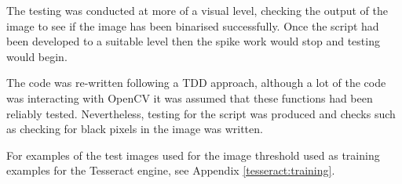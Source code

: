 The testing was conducted at more of a visual level, checking the output of the image to see if the image has been binarised successfully. Once the script had been developed to a suitable level then the spike work would stop and testing would begin.

The code was re-written following a TDD approach, although a lot of the code was interacting with OpenCV it was assumed that these functions had been reliably tested. Nevertheless, testing for the script was produced and checks such as checking for black pixels in the image was written.

For examples of the test images used for the image threshold used as training examples for the Tesseract engine, see Appendix \ref{tesseract:training}.
